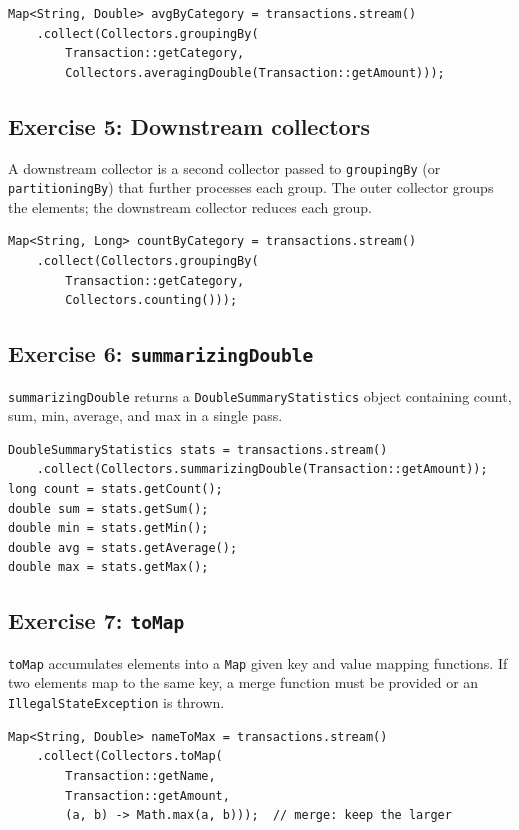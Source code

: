 \documentclass[twoside=false,DIV=14]{scrartcl}
\begin{document}
\begin{lstlisting}
Map<String, Double> avgByCategory = transactions.stream()
    .collect(Collectors.groupingBy(
        Transaction::getCategory,
        Collectors.averagingDouble(Transaction::getAmount)));
\end{lstlisting}

\subsection*{Exercise 5: Downstream collectors}

A downstream collector is a second collector passed to \texttt{groupingBy} (or \texttt{partitioningBy}) that further processes each group.  The outer collector groups the elements; the downstream collector reduces each group.

\begin{lstlisting}
Map<String, Long> countByCategory = transactions.stream()
    .collect(Collectors.groupingBy(
        Transaction::getCategory,
        Collectors.counting()));
\end{lstlisting}

\subsection*{Exercise 6: \texttt{summarizingDouble}}

\texttt{summarizingDouble} returns a \texttt{DoubleSummaryStatistics} object containing count, sum, min, average, and max in a single pass.

\begin{lstlisting}
DoubleSummaryStatistics stats = transactions.stream()
    .collect(Collectors.summarizingDouble(Transaction::getAmount));
long count = stats.getCount();
double sum = stats.getSum();
double min = stats.getMin();
double avg = stats.getAverage();
double max = stats.getMax();
\end{lstlisting}

\subsection*{Exercise 7: \texttt{toMap}}

\texttt{toMap} accumulates elements into a \texttt{Map} given key and value mapping functions.  If two elements map to the same key, a merge function must be provided or an \texttt{IllegalStateException} is thrown.

\begin{lstlisting}
Map<String, Double> nameToMax = transactions.stream()
    .collect(Collectors.toMap(
        Transaction::getName,
        Transaction::getAmount,
        (a, b) -> Math.max(a, b)));  // merge: keep the larger
\end{lstlisting}
\end{document}
